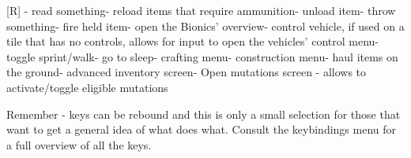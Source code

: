 [R] - read something\newline
[r] - reload items that require ammunition\newline
[U] - unload item\newline
[t] - throw something\newline
[f] - fire held item\newline
[p] - open the Bionics' overview\newline
[\^{}] - control vehicle, if used on a tile that has no controls, allows for input to open the vehicles' control menu\newline
["] - toggle sprint/walk\newline
[\$] - go to sleep\newline
[\&] - crafting menu\newline
[*] - construction menu\newline
[\textbackslash] - haul items on the ground\newline
[/] - advanced inventory screen\newline
[[] - Open mutations screen - allows to activate/toggle eligible mutations
 
Remember - keys can be rebound and this is only a small selection for those that want to get a general idea of what does what. Consult the keybindings menu for a full overview of all the keys. 